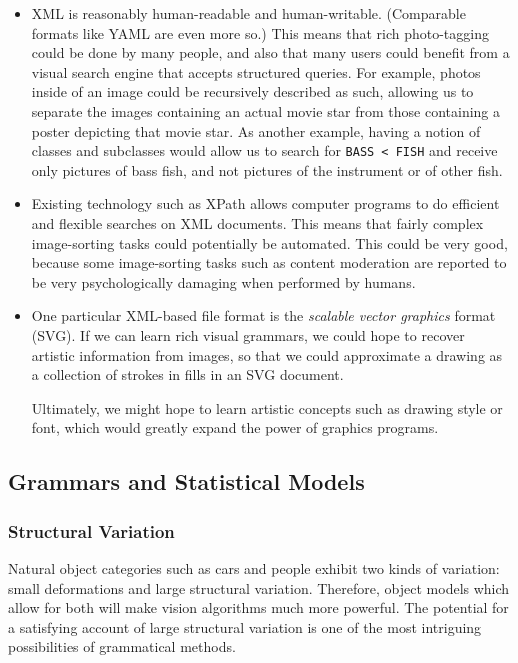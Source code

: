 \documentclass{article}
\begin{document}
\begin{itemize}
\item XML is reasonably human-readable and human-writable. (Comparable
  formats like YAML are even more so.) This means that rich
  photo-tagging could be done by many people, and also that many users
  could benefit from a visual search engine that accepts structured
  queries. For example, photos inside of an image could be recursively
  described as such, allowing us to separate the images containing an
  actual movie star from those containing a poster depicting that
  movie star. As another example, having a notion of classes and
  subclasses would allow us to search for \texttt{BASS < FISH} and
  receive only pictures of bass fish, and not pictures of the
  instrument or of other fish.

\item Existing technology such as XPath allows computer programs to do
  efficient and flexible searches on XML documents. This means that
  fairly complex image-sorting tasks could potentially be automated.
  This could be very good, because some image-sorting tasks such as
  content moderation are reported to be very psychologically
  damaging when performed by humans.

\item One particular XML-based file format is the \emph{scalable
    vector graphics} format (SVG). If we can learn rich visual
  grammars, we could hope to recover artistic information from images,
  so that we could approximate a drawing as a collection of strokes in
  fills in an SVG document.

  Ultimately, we might hope to learn artistic concepts such as drawing
  style or font, which would greatly expand the power of graphics
  programs.
\end{itemize}

\subsection{Grammars and Statistical Models}

\subsubsection{Structural Variation}
\label{sec-structural}

Natural object categories such as cars and people exhibit two kinds of
variation: small deformations and large structural
variation. Therefore, object models which allow for both will make
vision algorithms much more powerful.  The potential for a satisfying
account of large structural variation is one of the most intriguing
possibilities of grammatical methods.
\end{document}
